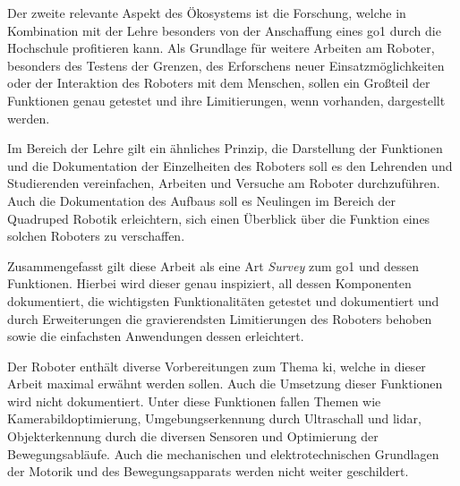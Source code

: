 Der zweite relevante Aspekt des Ökosystems ist die Forschung, welche in Kombination mit der Lehre besonders von der
Anschaffung eines \gls{go1} durch die Hochschule profitieren kann.
Als Grundlage für weitere Arbeiten am Roboter, besonders des Testens der Grenzen, des Erforschens neuer Einsatzmöglichkeiten
oder der Interaktion des Roboters mit dem Menschen, sollen ein Großteil der Funktionen genau getestet und ihre Limitierungen,
wenn vorhanden, dargestellt werden.

Im Bereich der Lehre gilt ein ähnliches Prinzip, die Darstellung der Funktionen und die Dokumentation der Einzelheiten
des Roboters soll es den Lehrenden und Studierenden vereinfachen, Arbeiten und Versuche am Roboter durchzuführen.
Auch die Dokumentation des Aufbaus soll es Neulingen im Bereich der Quadruped Robotik erleichtern, sich einen Überblick über
die Funktion eines solchen Roboters zu verschaffen.

Zusammengefasst gilt diese Arbeit als eine Art \emph{Survey} zum \gls{go1} und dessen Funktionen.
Hierbei wird dieser genau inspiziert, all dessen Komponenten dokumentiert, die wichtigsten Funktionalitäten getestet und
dokumentiert und durch Erweiterungen die gravierendsten Limitierungen des Roboters behoben sowie die einfachsten Anwendungen
dessen erleichtert.


Der Roboter enthält diverse Vorbereitungen zum Thema \gls{ki}, welche in dieser Arbeit maximal erwähnt werden sollen.
Auch die Umsetzung dieser Funktionen wird nicht dokumentiert.
Unter diese Funktionen fallen Themen wie Kamerabildoptimierung, Umgebungserkennung durch Ultraschall und \gls{lidar},
Objekterkennung durch die diversen Sensoren und Optimierung der Bewegungsabläufe.
Auch die mechanischen und elektrotechnischen Grundlagen der Motorik und des Bewegungsapparats werden nicht weiter
geschildert.
